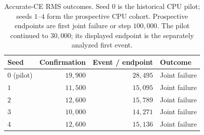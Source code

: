 \begin{table}[htbp]
\centering\small
\setlength{\tabcolsep}{4pt}
\caption{Accurate-CE RMS outcomes. Seed $0$ is the historical CPU pilot; seeds $1$--$4$ form the prospective CPU cohort. Prospective endpoints are first joint failure or step $100{,}000$. The pilot continued to $30{,}000$; its displayed endpoint is the separately analyzed first event.}
\label{tab:rms-replication-outcomes}
\begin{tabular}{lrrl}
\toprule
Seed & Confirmation & Event / endpoint & Outcome \\
\midrule
$0$ (pilot) & $19{,}900$ & $28{,}495$ & Joint failure \\
$1$ & $11{,}500$ & $15{,}095$ & Joint failure \\
$2$ & $12{,}600$ & $15{,}789$ & Joint failure \\
$3$ & $10{,}000$ & $14{,}271$ & Joint failure \\
$4$ & $12{,}600$ & $15{,}136$ & Joint failure \\
\bottomrule
\end{tabular}
\end{table}
